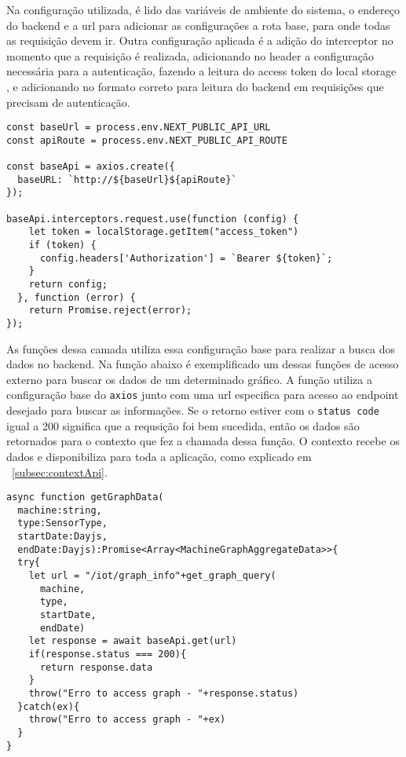 Na configuração utilizada, é lido das variáveis de ambiente do sistema, o endereço do backend e a url para adicionar as configurações a rota base, para onde todas as requisição devem ir. Outra configuração aplicada é a adição do interceptor \cite{axiosInterceptors} no momento que a requisição é realizada, adicionando no header a configuração necessária para a autenticação, fazendo a leitura do access token do local storage \cite{mdnLocalStorage}, e adicionando no formato correto para leitura do backend em requisições que precisam de autenticação.

\begin{verbatim}
const baseUrl = process.env.NEXT_PUBLIC_API_URL
const apiRoute = process.env.NEXT_PUBLIC_API_ROUTE

const baseApi = axios.create({
  baseURL: `http://${baseUrl}${apiRoute}`
});

baseApi.interceptors.request.use(function (config) {
    let token = localStorage.getItem("access_token")
    if (token) {
      config.headers['Authorization'] = `Bearer ${token}`;
    }
    return config;
  }, function (error) {
    return Promise.reject(error);
});
\end{verbatim}

As funções dessa camada utiliza essa configuração base para realizar a busca dos dados no backend. Na função abaixo é exemplificado um dessas funções de acesso externo para buscar os dados de um determinado gráfico. A função utiliza a configuração base do \texttt{axios} junto com uma url especifica para acesso ao endpoint desejado para buscar as informações. Se o retorno estiver com o \texttt{status code} igual a 200 significa que a requsição foi bem sucedida, então os dados são retornados para o contexto que fez a chamada dessa função. O contexto recebe os dados e disponibiliza para toda a aplicação, como explicado em ~\ref{subsec:contextApi}.

\begin{verbatim}
async function getGraphData(
  machine:string,
  type:SensorType,
  startDate:Dayjs,
  endDate:Dayjs):Promise<Array<MachineGraphAggregateData>>{
  try{
    let url = "/iot/graph_info"+get_graph_query(
      machine,
      type,
      startDate,
      endDate)
    let response = await baseApi.get(url)
    if(response.status === 200){
      return response.data
    }
    throw("Erro to access graph - "+response.status)
  }catch(ex){
    throw("Erro to access graph - "+ex)
  }
}
\end{verbatim}


